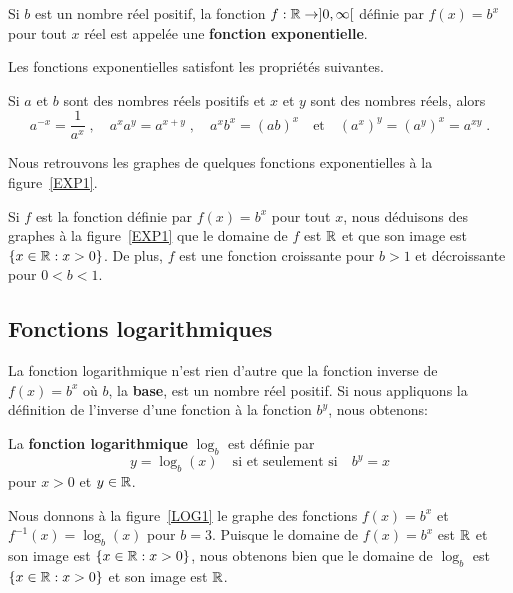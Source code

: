 {\begin{defn} 
Si $b$ est un nombre réel positif, la fonction
$f:\mathbb{R}\rightarrow ]0,\infty[$ définie par $f(x) = b^x$ pour tout $x$
réel est appelée une {\bfseries fonction exponentielle}.
\end{defn}

Les fonctions exponentielles satisfont les propriétés suivantes.

\begin{prop}
Si $a$ et $b$ sont des nombres réels positifs et $x$ et $y$ sont des
nombres réels, alors
\[
a^{-x} = \frac{1}{a^x} \; , \quad a^x a^y = a^{x+y} \; ,
\quad a^x b^x = (ab)^x \quad \text{et} \quad
\left(a^x\right)^y = \left(a^y\right)^x = a^{xy} \; .
\]
\end{prop}

Nous retrouvons les graphes de quelques fonctions exponentielles à la
figure~\ref{EXP1}.

Si $f$ est la fonction définie par $f(x) = b^x$ pour tout $x$, nous
déduisons des graphes à la figure~\ref{EXP1} que le domaine de $f$ est
$\mathbb{R}$ et que son image est $\{ x \in \mathbb{R} : x > 0 \}$.  De plus, $f$
est une fonction croissante pour $b>1$ et décroissante pour $0<b<1$.

\subsection{Fonctions logarithmiques}

La fonction logarithmique n'est rien d'autre que la fonction inverse
de $f(x) = b^x$ où $b$, la {\bfseries base}, est un nombre réel
positif.  Si nous appliquons la définition de l'inverse d'une fonction à
la fonction $b^y$, nous obtenons:

\begin{defn} 
La {\bfseries fonction logarithmique} $\log_b$ est définie par
\[
y = \log_b(x)  \quad \text{si et seulement si} \quad  b^y = x
\]
pour $x>0$ et $y\in\mathbb{R}$.
\end{defn}

Nous donnons à la figure~\ref{LOG1} le graphe des fonctions $f(x) = b^x$
et $f^{-1}(x) = \log_b(x)$ pour $b=3$.  Puisque le domaine de
$f(x) = b^x$ est $\mathbb{R}$ et son image est $\{ x \in \mathbb{R} : x > 0 \}$, nous
obtenons bien que le domaine de $\log_b$ est $\{ x \in \mathbb{R} : x > 0 \}$
et son image est $\mathbb{R}$.

}
